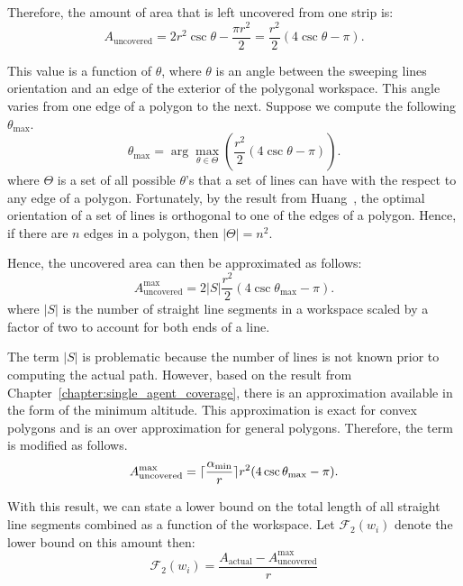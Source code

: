\documentclass[../main.tex]{subfiles}
\begin{document}
Therefore, the amount of area that is left uncovered from one strip is:
\begin{equation}
	A_{\text{uncovered}}=2r^2\csc\theta-\frac{\pi r^2}{2}=\frac{r^2}{2}(4\csc\theta-\pi).
\end{equation}

This value is a function of $\theta$, where $\theta$ is an angle between the sweeping lines orientation and an edge of the exterior of the polygonal workspace. This angle varies from one edge of a polygon to the next. Suppose we compute the following $\theta_{\max}$.
\begin{equation}
	\theta_{\max}=\arg\max_{\theta\in\Theta}(\frac{r^2}{2}(4\csc\theta-\pi)).
\end{equation}%
where $\Theta$ is a set of all possible $\theta$'s that a set of lines can have with the respect to any edge of a polygon. Fortunately, by the result from Huang~\cite{Huang2001optimal}, the optimal orientation of a set of lines is orthogonal to one of the edges of a polygon. Hence, if there are $n$ edges in a polygon, then $|\Theta|=n^2$.

Hence, the uncovered area can then be approximated as follows:
\begin{equation}
	A_{\text{uncovered}}^{\max}=2|S|\frac{r^2}{2}(4\csc\theta_{\max}-\pi).
\end{equation}%
where $|S|$ is the number of straight line segments in a workspace scaled by a factor of two to account for both ends of a line.

The term $|S|$ is problematic because the number of lines is not known prior to computing the actual path. However, based on the result from Chapter~\ref{chapter:single_agent_coverage}, there is an approximation available in the form of the minimum altitude. This approximation is exact for convex polygons and is an over approximation for general polygons. Therefore, the term is modified as follows.
\begin{equation}
	A_{\text{uncovered}}^{\max}=\lceil\frac{\alpha_{\min}}{r}\rceil r^2(4\csc\theta_{\max}-\pi).
\end{equation}%


With this result, we can state a lower bound on the total length of all straight line segments combined as a function of the workspace. Let $\mathcal{F}_2(w_i)$ denote the lower bound on this amount then:
\begin{equation}
	\mathcal{F}_2(w_i)=\frac{A_{\text{actual}}-A_{\text{uncovered}}^{\max}}{r}
\end{equation}
\end{document}
